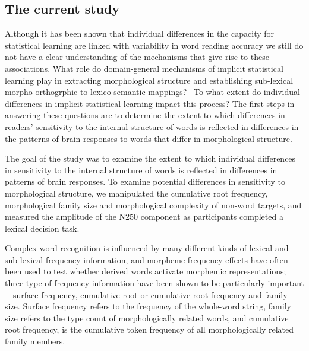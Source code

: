 \documentclass[preprint,12pt, authoryear, review]{elsarticle}
\begin{document}
\subsection{The current study}

Although it has been shown that individual differences in the capacity for statistical learning are linked with variability in word reading accuracy \citep{arciuliReadingStatisticalLearning2018, arciuliStatisticalLearningRelated2012} we still do not have a clear understanding of the mechanisms that give rise to these associations. What role do domain-general mechanisms of implicit statistical learning play in extracting morphological structure and establishing sub-lexical morpho-orthogrphic to lexico-semantic mappings?  To what extent do individual differences in implicit statistical learning impact this process? The first steps in answering these questions are to determine the extent to which differences in readers’ sensitivity to the internal structure of words is reflected in differences in the patterns of brain responses to words that differ in morphological structure. 

The goal of the study was to examine the extent to which  individual differences in sensitivity to the internal structure of words is reflected in differences in  patterns of brain responses. To examine potential differences in sensitivity to morphological structure, we manipulated the cumulative root frequency, morphological family size and morphological complexity of non-word targets, and measured the amplitude of the N250 component as participants completed a lexical decision task.  

Complex word recognition is influenced by many different kinds of lexical and sub-lexical frequency  information, and morpheme frequency effects have often been used to test whether derived words activate morphemic representations; three type of frequency information have been shown to be particularly important—surface frequency, cumulative root or cumulative root frequency and family size. Surface frequency refers to the frequency of the whole-word string, family size refers to the type count of morphologically related words, and cumulative root frequency, is the cumulative token frequency of all morphologically related family members. 
\end{document}
